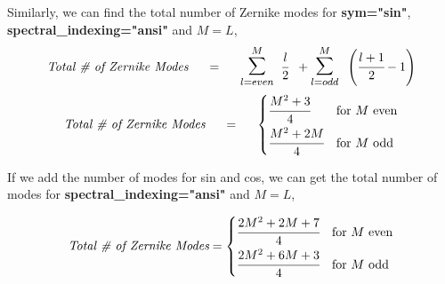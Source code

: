 Similarly, we can find the total number of Zernike modes for \textbf{sym="sin"}, \textbf{spectral\_indexing="ansi"} and $M=L$,
\begin{equation}
    \textit{Total \# of Zernike Modes} \hspace{0.5cm} = \hspace{0.5cm} \mathlarger{\mathlarger{\sum}}_{l=even}^{M} \hspace{0.2cm} \cfrac{l}{2} \hspace{0.2cm}+ \mathlarger{\mathlarger{\sum}}_{l=odd}^{M} \hspace{0.2cm} \left(\cfrac{l+1}{2} - 1\right)
\end{equation}
\begin{equation}
    \textit{Total \# of Zernike Modes} \hspace{0.5cm} = \hspace{0.5cm} \begin{cases}
        \cfrac{M^2 + 3}{4}  &\text{for $M$ even} \\[0.2cm]
        \cfrac{M^2 + 2M}{4} &\text{for $M$ odd} 
    \end{cases}  
\end{equation}

If we add the number of modes for sin and cos, we can get the total number of modes for \textbf{spectral\_indexing="ansi"} and $M=L$,

\begin{equation}
    \textit{Total \# of Zernike Modes}  =  \begin{cases}
        \cfrac{2M^2 + 2M + 7}{4}  &\text{for $M$ even} \\[0.2cm]
        \cfrac{2M^2 + 6M + 3}{4} &\text{for $M$ odd} 
    \end{cases}  
\end{equation}